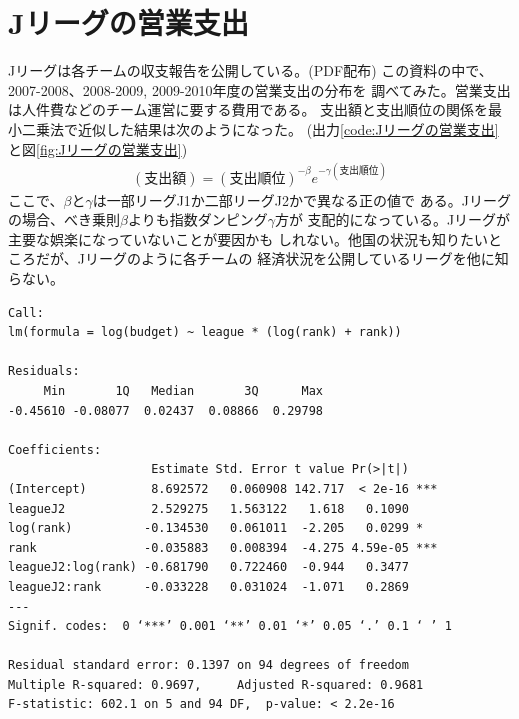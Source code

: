 \section{Jリーグの営業支出}\label{s1:Jリーグの営業支出} %
	\lstset{basicstyle=\ttfamily\small, language=R}
	Jリーグは各チームの収支報告を公開している。(PDF配布\cite{html:j-club})
	この資料の中で、2007-2008、2008-2009, 2009-2010年度の営業支出の分布を
	調べてみた。営業支出は人件費などのチーム運営に要する費用である。
	支出額と支出順位の関係を最小二乗法で近似した結果は次のようになった。
	(出力\ref{code:Jリーグの営業支出}と図\ref{fig:Jリーグの営業支出})
	\begin{equation*}\begin{split} %
		(\text{支出額}) = (\text{支出順位})^{-\beta}e^{-\gamma(\text{支出順位})}
	\end{split}\end{equation*} %
	ここで、$\beta$と$\gamma$は一部リーグJ1か二部リーグJ2かで異なる正の値で
	ある。Jリーグの場合、べき乗則$\beta$よりも指数ダンピング$\gamma$方が
	支配的になっている。Jリーグが主要な娯楽になっていないことが要因かも
	しれない。他国の状況も知りたいところだが、Jリーグのように各チームの
	経済状況を公開しているリーグを他に知らない。

	\begin{lstlisting}[caption=Jリーグの営業支出, label=code:Jリーグの営業支出]
Call:
lm(formula = log(budget) ~ league * (log(rank) + rank))

Residuals:
     Min       1Q   Median       3Q      Max 
-0.45610 -0.08077  0.02437  0.08866  0.29798 

Coefficients:
                    Estimate Std. Error t value Pr(>|t|)    
(Intercept)         8.692572   0.060908 142.717  < 2e-16 ***
leagueJ2            2.529275   1.563122   1.618   0.1090    
log(rank)          -0.134530   0.061011  -2.205   0.0299 *  
rank               -0.035883   0.008394  -4.275 4.59e-05 ***
leagueJ2:log(rank) -0.681790   0.722460  -0.944   0.3477    
leagueJ2:rank      -0.033228   0.031024  -1.071   0.2869    
---
Signif. codes:  0 ‘***’ 0.001 ‘**’ 0.01 ‘*’ 0.05 ‘.’ 0.1 ‘ ’ 1 

Residual standard error: 0.1397 on 94 degrees of freedom
Multiple R-squared: 0.9697,     Adjusted R-squared: 0.9681 
F-statistic: 602.1 on 5 and 94 DF,  p-value: < 2.2e-16
	\end{lstlisting}

